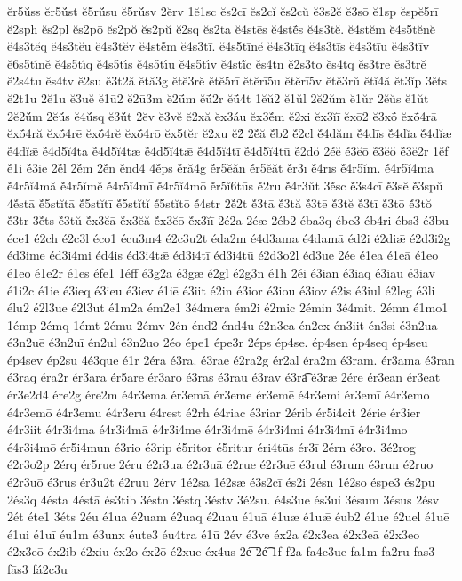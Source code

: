 {ĕr5ŭ́ss
ĕr5ŭ́st
ĕ5rŭ́su
ĕ5rŭ́sv
2ĕrv
1ĕ1sc
ĕs2cī
ĕs2cĭ
ĕs2cŭ
ĕ3s2ĕ
ĕ3sō
ĕ1sp
ĕspĕ5rī
ĕ2sph
ĕs2pl
ĕs2pō
ĕs2pŏ
ĕs2pŭ
ĕ2sq
ĕs2ta
ĕ4stēs
ĕ4stḗs
ĕ4s3tĕ.
ĕ4stĕm
ĕ4s5tĕnĕ
ĕ4s3tĕq
ĕ4s3tĕu
ĕ4s3tĕv
ĕ4stĕ́m
ĕ4s3tī.
ĕ4s5tīnĕ
ĕ4s3tīq
ĕ4s3tīs
ĕ4s3tīu
ĕ4s3tīv
ĕ6s5tī́nĕ
ĕ4s5tī́q
ĕ4s5tī́s
ĕ4s5tī́u
ĕ4s5tī́v
ĕ4stĭ́c
ĕs4tn
ĕ2s3tō
ĕs4tq
ĕs3trē
ĕs3trĕ
ĕ2s4tu
ĕs4tv
ĕ2su
ĕ3t2ă
ĕtă3g
ĕtĕ3rĕ
ĕtĕ5rī
ĕtĕrī5u
ĕtĕrī5v
ĕtĕ3rŭ
ĕtĭ4ă
ĕt3ĭp
3ĕts
ĕ2t1u
2ĕ1u
ĕ3uĕ
ĕ1ū2
ĕ2ū3m
ĕ2ū́m
ĕū́2r
ĕū́4t
1ĕŭ2
ĕ1ŭl
2ĕ2ŭm
ĕ1ŭr
2ĕŭs
ĕ1ŭt
2ĕ2ŭ́m
2ĕŭ́s
ĕ4ŭ́sq
ĕ3ŭ́t
2ĕv
ĕ3vĕ
ĕ2xă
ĕx3áu
ĕx3ĕ́m
ĕ2xi
ĕx3ĭī
ĕxō2
ĕ3xṓ
ĕxṓ4rā
ĕxṓ4ră
ĕxṓ4rē
ĕxṓ4rĕ
ĕxṓ4rō
ĕx5tĕr
ĕ2xu
ĕ2́
2ĕ́ă
ĕ́b2
ĕ́2cl
ĕ́4dăm
ĕ́4dīs
ĕ́4dĭa
ĕ́4dĭæ
ĕ́4dĭǣ
ĕ́4d5ĭ4ta
ĕ́4d5ĭ4tæ
ĕ́4d5ĭ4tǣ
ĕ́4d5ĭ4tī
ĕ́4d5ĭ4tū
ĕ́2dŏ
2ĕ́ĕ
ĕ́3ĕō
ĕ́3ĕŏ
ĕ́3ĕ2r
1ĕ́f
ĕ́1i
ĕ́3iē
2ĕ́l
2ĕ́m
2ĕ́n
ĕ́nd4
4ĕ́ps
ĕ́ră4g
ĕ́r5ĕăn
ĕ́r5ĕăt
ĕ́r3ī
ĕ́4rīs
ĕ́4r5ĭm.
ĕ́4r5ĭ4mā
ĕ́4r5ĭ4mă
ĕ́4r5ĭmĕ
ĕ́4r5ĭ4mī
ĕ́4r5ĭ4mō
ĕ́r5ĭ6tūs
ĕ́2ru
ĕ́4r3ŭt
3ĕ́sc
ĕ́3s4cī
ĕ́3sĕ
ĕ́3spŭ
4ĕ́stā
ĕ́5stĭtā
ĕ́5stĭtī
ĕ́5stĭtĭ
ĕ́5stĭtō
ĕ́4str
2ĕ́2t
ĕ́3tā
ĕ́3tă
ĕ́3tē
ĕ́3tĕ
ĕ́3tī
ĕ́3tō
ĕ́3tŏ
ĕ́3tr
3ĕ́ts
ĕ́3tŭ
ĕ́x3ĕā
ĕ́x3ĕă
ĕ́x3ĕō
ĕ́x3ĭī
2é2a
2éæ
2éb2
éba3q
ébe3
éb4ri
ébs3
é3bu
éce1
é2ch
é2c3l
éco1
écu3m4
é2c3u2t
éda2m
é4d3ama
é4damā
éd2i
é2diǣ
é2d3i2g
éd3ime
éd3i4mi
éd4is
éd3i4tǣ
éd3i4tī
éd3i4tū
é2d3o2l
éd3ue
2ée
é1ea
é1eā
é1eo
é1eō
é1e2r
é1es
éfe1
1éff
é3g2a
é3gæ
é2gl
é2g3n
é1h
2éi
é3ian
é3iaq
é3iau
é3iav
é1i2c
é1ie
é3ieq
é3ieu
é3iev
é1iē
é3iit
é2in
é3ior
é3iou
é3iov
é2is
é3iul
é2leg
é3li
élu2
é2l3ue
é2l3ut
é1m2a
ém2e1
3é4mera
ém2i
é2mic
2émin
3é4mit.
2émn
é1mo1
1émp
2émq
1émt
2ému
2émv
2én
énd2
énd4u
é2n3ea
én2ex
én3iit
én3si
é3n2ua
é3n2uē
é3n2uī
én2ul
é3n2uo
2éo
épe1
épe3r
2éps
ép4se.
ép4sen
ép4seq
ép4seu
ép4sev
ép2su
4é3que
é1r
2éra
é3ra.
é3rae
é2ra2g
ér2al
éra2m
é3ram.
ér3ama
é3ran
é3raq
éra2r
ér3ara
ér5are
ér3aro
é3ras
é3rau
é3rav
é3ra͡
é3ræ
2ére
ér3ean
ér3eat
ér3e2d4
ére2g
ére2m
é4r3ema
ér3emā
ér3eme
ér3emē
é4r3emi
ér3emī
é4r3emo
é4r3emō
é4r3emu
é4r3eru
é4rest
é2rh
é4riac
é3riar
2érib
ér5i4cit
2érie
ér3ier
é4r3iit
é4r3i4ma
é4r3i4mā
é4r3i4me
é4r3i4mē
é4r3i4mi
é4r3i4mī
é4r3i4mo
é4r3i4mō
ér5i4mun
é3rio
é3rip
é5ritor
é5ritur
éri4tūs
ér3ī
2érn
é3ro.
3é2rog
é2r3o2p
2érq
ér5rue
2éru
é2r3ua
é2r3uā
é2rue
é2r3uē
é3rul
é3rum
é3run
é2ruo
é2r3uō
é3rus
ér3u2t
é2ruu
2érv
1é2sa
1é2sæ
é3s2cī
és2i
2ésn
1é2so
éspe3
és2pu
2és3q
4ésta
4éstā
és3tib
3éstn
3éstq
3éstv
3é2su.
é4s3ue
és3ui
3ésum
3ésus
2ésv
2ét
éte1
3éts
2éu
é1ua
é2uam
é2uaq
é2uau
é1uā
é1uæ
é1uǣ
éub2
é1ue
é2uel
é1uē
é1ui
é1uī
éu1m
é3unx
éute3
éu4tra
é1ū
2év
é3ve
éx2a
é2x3ea
é2x3eā
é2x3eo
é2x3eō
éx2ib
é2xiu
éx2o
éx2ō
é2xue
éx4us
2é͞
2é͡
1f
f2a
fa4c3ue
fa1m
fa2ru
fas3
fās3
fá2c3u
}
